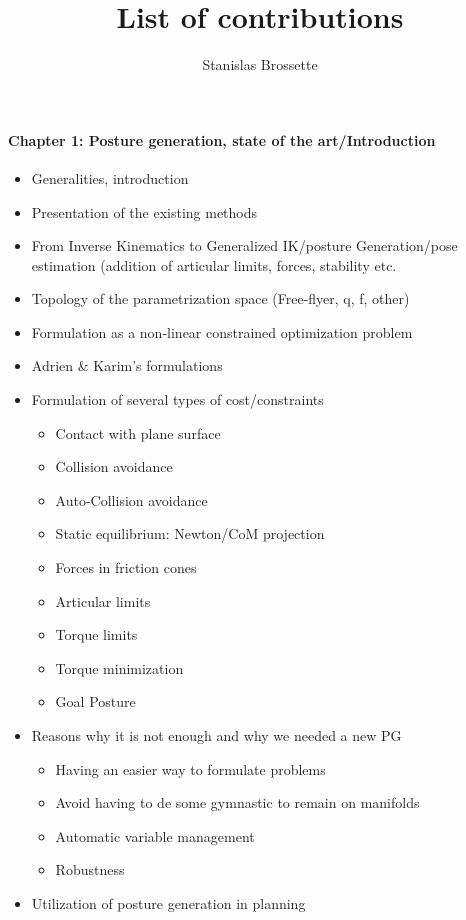 \documentclass{article}
\begin{document}
\title{List of contributions}
\author{Stanislas Brossette}

\maketitle



\paragraph {Chapter 1: Posture generation, state of the art/Introduction}
\begin{itemize}
  \item Generalities, introduction
  \item Presentation of the existing methods
  \item From Inverse Kinematics to Generalized IK/posture Generation/pose estimation (addition of articular limits, forces, stability etc.
  \item Topology of the parametrization space (Free-flyer, q, f, other)
  \item Formulation as a non-linear constrained optimization problem
  \item Adrien \& Karim's formulations
  \item Formulation of several types of cost/constraints
  \begin{itemize}
    \item Contact with plane surface
    \item Collision avoidance
    \item Auto-Collision avoidance
    \item Static equilibrium: Newton/CoM projection
    \item Forces in friction cones
    \item Articular limits
    \item Torque limits
    \item Torque minimization
    \item Goal Posture
  \end{itemize}
  \item Reasons why it is not enough and why we needed a new PG
    \begin{itemize}
      \item Having an easier way to formulate problems
      \item Avoid having to de some gymnastic to remain on manifolds
      \item Automatic variable management
      \item Robustness
    \end{itemize}
  \item Utilization of posture generation in planning
\end{itemize}
\end{document}
